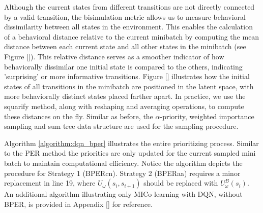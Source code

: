 Although the current states from different transitions are not directly connected by a valid transition, the bisimulation metric allows us to measure behavioral dissimilarity between all states in the environment. This enables the calculation of a behavioral distance relative to the current minibatch by computing the mean distance between each current state and all other states in the minibatch (see Figure \ref{}). This relative distance serves as a smoother indicator of how behaviorally dissimilar one initial state is compared to the others, indicating 'surprising' or more informative transitions. Figure \ref{} illustrates how the initial states of all transitions in the minibatch are positioned in the latent space, with more behaviorally distinct states placed farther apart. In practice, we use the squarify method, along with reshaping and averaging operations, to compute these distances on the fly. Similar as before, the $\alpha$-priority, weighted importance sampling and sum tree data structure are used for the sampling procedure.

Algorithm \ref{algorithm:dqn_bper} illustrates the entire prioritizing process. Similar to the PER method the priorities are only updated for the current sampled mini batch to maintain computational efficiency. Notice the algorithm depicts the procedure for Strategy 1 (BPERcn). Strategy 2 (BPERaa) requires a minor replacement in line 19, where \(U_\omega(s_i, s_{i+1})\) should be replaced with \(U^B_\omega(s_i)\). An additional algorithm illustrating only MICo learning with DQN, without BPER, is provided in Appendix \ref{} for reference.


